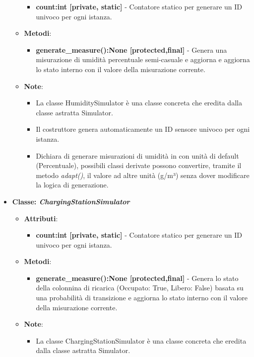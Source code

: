 \begin{itemize}
\begin{itemize}
\begin{itemize}
        \item \textbf{count:int [private, static]} - Contatore statico per generare un ID univoco per ogni istanza.
    \end{itemize}
    \item \textbf{Metodi}: 
    \begin{itemize}
        \item \textbf{generate\_measure():None [protected,final]} - Genera una misurazione di umidità percentuale semi-casuale e aggiorna e aggiorna lo stato interno con il valore della misurazione corrente.
    \end{itemize}
    \item \textbf{Note}:
    \begin{itemize}
        \item La classe HumiditySimulator è una classe concreta che eredita dalla classe astratta Simulator.
        \item Il costruttore genera automaticamente un ID sensore univoco per ogni istanza.
        \item Dichiara di generare misurazioni di umidità in con unità di default (Percentuale), possibili classi derivate possono convertire, tramite il metodo \textit{adapt()}, il valore ad altre unità (g/m³) senza dover modificare la logica di generazione.
    \end{itemize}
\end{itemize}
    \item{\textbf{Classe: \textit{ChargingStationSimulator}}}
    \begin{itemize}
        \item  \textbf{Attributi}: 
    \begin{itemize}
        \item \textbf{count:int [private, static]} - Contatore statico per generare un ID univoco per ogni istanza.
    \end{itemize}
    \item  \textbf{Metodi}:
    \begin{itemize}
        \item \textbf{generate\_measure():None [protected,final]} - Genera lo stato della colonnina di ricarica (Occupato: True, Libero: False) basata su una probabilità di transizione e aggiorna lo stato interno con il valore della misurazione corrente.
    \end{itemize}
    \item   \textbf{Note}:
    \begin{itemize}
        \item La classe ChargingStationSimulator è una classe concreta che eredita dalla classe astratta Simulator.

\end{itemize}
\end{itemize}
\end{itemize}
